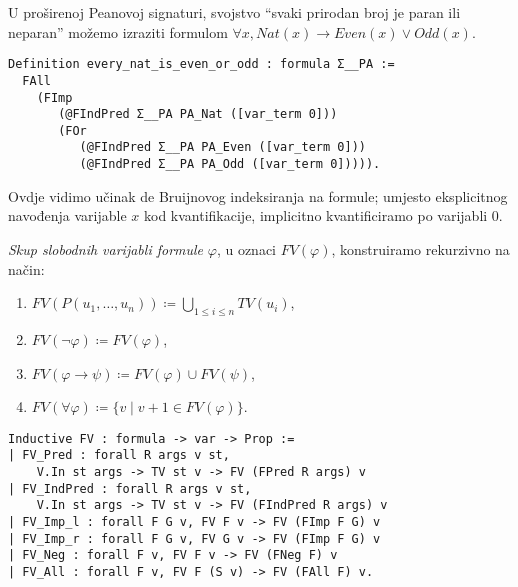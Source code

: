 \begin{example}
  U proširenoj Peanovoj signaturi, svojstvo \enquote{svaki prirodan broj je paran ili neparan}
  možemo izraziti formulom \( \forall x, \mathit{Nat}(x) \rightarrow \mathit{Even}(x) \lor \mathit{Odd}(x) \).
\begin{verbatim}
Definition every_nat_is_even_or_odd : formula Σ__PA :=
  FAll
    (FImp
       (@FIndPred Σ__PA PA_Nat ([var_term 0]))
       (FOr
          (@FIndPred Σ__PA PA_Even ([var_term 0]))
          (@FIndPred Σ__PA PA_Odd ([var_term 0])))).
\end{verbatim}
  \noindent Ovdje vidimo učinak de Bruijnovog indeksiranja na formule;
  umjesto eksplicitnog navođenja varijable \(x\) kod kvantifikacije,
  implicitno kvantificiramo po varijabli \(0\).
\end{example}

\begin{definition}
  \textit{Skup slobodnih varijabli formule} \(\varphi\), u oznaci \(\mathit{FV}(\varphi)\), konstruiramo rekurzivno na način:
  \begin{enumerate}
  \item \( \mathit{FV}(P(u_{1}, \ldots, u_{n})) \coloneq \bigcup_{1 \le i \le n} \mathit{TV}(u_{i}) \),
  \item \( \mathit{FV}(\neg\varphi) \coloneq \mathit{FV}(\varphi)\),
  \item \( \mathit{FV}(\varphi \rightarrow \psi) \coloneq \mathit{FV}(\varphi) \cup \mathit{FV}(\psi) \),
  \item \( \mathit{FV(\forall \varphi)} \coloneq \{ v \mid v + 1 \in \mathit{FV}(\varphi) \} \).
  \end{enumerate}
\begin{verbatim}
Inductive FV : formula -> var -> Prop :=
| FV_Pred : forall R args v st,
    V.In st args -> TV st v -> FV (FPred R args) v
| FV_IndPred : forall R args v st,
    V.In st args -> TV st v -> FV (FIndPred R args) v
| FV_Imp_l : forall F G v, FV F v -> FV (FImp F G) v
| FV_Imp_r : forall F G v, FV G v -> FV (FImp F G) v
| FV_Neg : forall F v, FV F v -> FV (FNeg F) v
| FV_All : forall F v, FV F (S v) -> FV (FAll F) v.
\end{verbatim}
\end{definition}

